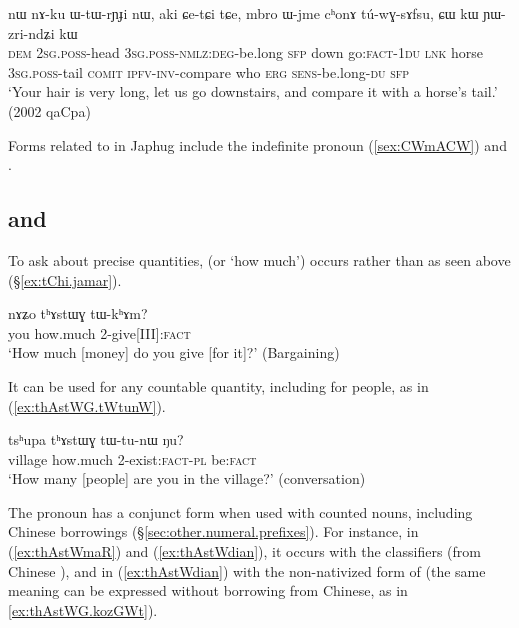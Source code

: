 \begin{exe}
\ex  \label{ex:CW.kW.YWzrindZi}
\gll nɯ nɤ-ku ɯ-tɯ-rɲɟi nɯ, aki ɕe-tɕi tɕe, mbro ɯ-jme cʰonɤ tú-wɣ-sɤfsu, ɕɯ kɯ ɲɯ-zri-ndʑi kɯ \\
\textsc{dem} \textsc{2sg}.\textsc{poss}-head \textsc{3sg}.\textsc{poss}-\textsc{nmlz}:\textsc{deg}-be.long  \textsc{sfp} down go:\textsc{fact}-\textsc{1du} \textsc{lnk} horse \textsc{3sg}.\textsc{poss}-tail \textsc{comit}  \textsc{ipfv}-\textsc{inv}-compare who \textsc{erg} \textsc{sens}-be.long-\textsc{du} \textsc{sfp} \\
\glt `Your hair is very long, let us go downstairs, and compare it with a horse's tail.' (2002 qaCpa)
\end{exe}  

Forms related to  in Japhug include the indefinite pronoun  (\ref{sex:CWmACW}) and .

\subsection{ and } \label{sec:thAstWG}
To ask about precise quantities,  (or `how much') occurs rather than  as seen above (§\ref{ex:tChi.jamar}).

\begin{exe}
\ex \label{ex:thAstWG.tWkhAm}
 \gll nɤʑo tʰɤstɯɣ tɯ-kʰɤm?    \\
 you how.much 2-give[III]:\textsc{fact}  \\
\glt  `How much [money] do you give [for it]?' (Bargaining)
\end{exe} 

It can be used for any countable quantity, including for people, as in (\ref{ex:thAstWG.tWtunW}).

\begin{exe}
\ex \label{ex:thAstWG.tWtunW}
 \gll tsʰupa tʰɤstɯɣ tɯ-tu-nɯ ŋu? \\
village how.much 2-exist:\textsc{fact}-\textsc{pl} be:\textsc{fact} \\
\glt `How many [people] are you in the village?' (conversation)
\end{exe} 

The pronoun  has a conjunct form  when used with counted nouns, including Chinese borrowings (§\ref{sec:other.numeral.prefixes}). For instance, in (\ref{ex:thAstWmaR}) and (\ref{ex:thAstWdian}), it occurs with the classifiers  (from Chinese  ), and in (\ref{ex:thAstWdian}) with the non-nativized form of  (the same meaning can be expressed without borrowing from Chinese, as in \ref{ex:thAstWG.kozGWt}).

